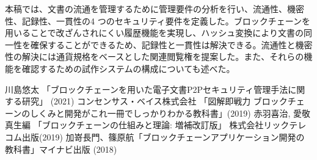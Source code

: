 \documentclass[10.5pt,a4paper,twocolumn]{jsarticle}
\begin{document}
本稿では、文書の流通を管理するために管理要件の分析を行い、流通性、機密性、記録性、一貫性の4 つのセキュリティ要件を定義した。ブロックチェーンを用いることで改ざんされにくい履歴機能を実現し、ハッシュ変換により文書の同一性を確保することができるため、記録性と一貫性は解決できる。流通性と機密性の解決には通貨規格をベースとした関連閲覧権を提案した。また、それらの機能を確認するための試作システムの構成についても述べた。


\begin{thebibliography}{99}
川島悠太 「ブロックチェーンを用いた電子文書P2Pセキュリティ管理手法に関する研究」
(2021)
コンセンサス・ベイス株式会社 「図解即戦力 ブロックチェーンのしくみと開発がこれ一冊でしっかりわかる教科書」(2019)
赤羽喜治, 愛敬真生編 「ブロックチェーンの仕組みと理論: 増補改訂版」 株式会社リックテレコム出版(2019)
加嵜長門、篠原航「ブロックチェーンアプリケーション開発の教科書」マイナビ出版 (2018)
\end{thebibliography}
\end{document}
